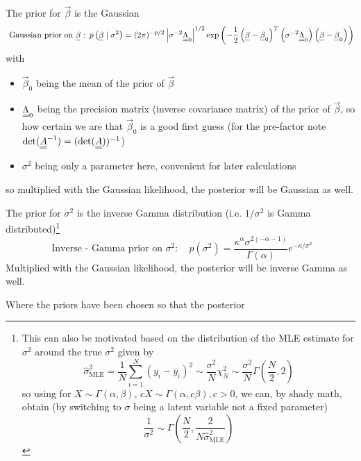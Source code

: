The prior for $\vec{\beta}$ is the Gaussian
\begin{equation}
    \text { Gaussian prior on } \vec{\beta} \text { : } p\left(\vec{\beta} \mid \sigma^2\right)=(2 \pi)^{-p / 2}\left|\sigma^{-2} \mat{\Lambda}_0\right|^{1 / 2} \exp{\left(-\frac{1}{2}\left(\vec{\beta}-\vec{\beta}_0\right)^T\left(\sigma^{-2} \mat{\Lambda}_0\right)\left(\vec{\beta}-\vec{\beta}_0\right)\right)}
\end{equation}
with
\begin{itemize}
    \item $\vec{\beta}_0$ being the mean of the prior of $\vec{\beta}$
    \item $\mat{\Lambda}_0$ being the precision matrix (inverse covariance matrix) of the prior of $\vec{\beta}$, so how certain we are that $\vec{\beta}_0$ is a good first guess (for the pre-factor note $\det(\mat{A}^{-1}) = (\det(\mat{A}))^{-1}$)
    \item $\sigma^2$ being only a parameter here, convenient for later calculations
\end{itemize}
so multiplied with the Gaussian likelihood, the posterior will be Gaussian as well.

The prior for $\sigma^2$ is the inverse Gamma distribution (i.e. $1\slash \sigma^2$ is Gamma distributed)\footnote{This can also be motivated based on the distribution
of the MLE estimate for $\sigma^2$ around the true $\sigma^2$ given by
\begin{equation}
    \hat{\sigma}^2_\text{MLE} = \frac{1}{N} \sum_{i=1}^N (y_i - \bar{y}_i)^2 \sim \frac{\sigma^2}{N} \chi^2_{N} \sim \frac{\sigma^2}{N} \Gamma\left(\frac{N}{2},2\right)
\end{equation}
so using for $X \sim \Gamma(\alpha,\beta)$, $cX \sim \Gamma(\alpha,c\beta), c > 0$, we can, by shady math, obtain (by switching to $\sigma$ being a latent variable not a fixed parameter)
\begin{equation}
    \frac{1}{\sigma^2} \sim \Gamma\left(\frac{N}{2},\frac{2}{N\hat{\sigma}^2_\text{MLE}}\right)
\end{equation}
}
\begin{equation}
    \text { Inverse - Gamma prior on } \sigma^2: \quad p\left(\sigma^2\right)=\frac{\kappa^\alpha \sigma^{2(-\alpha-1)}}{\Gamma(\alpha)} e^{-\kappa / \sigma^2}
\end{equation}
Multiplied with the Gaussian likelihood, the posterior will be inverse Gamma as well.

Where the priors have been chosen so that the posterior

